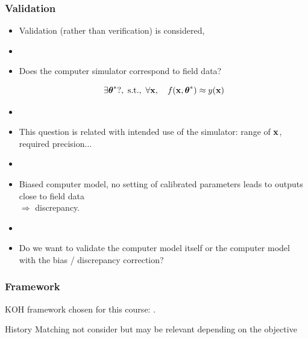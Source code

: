 \documentclass[nopagenumber,9pt]{beamer}
\begin{document}
  \begin{frame}
 \frametitle{Validation}
 \begin{itemize}
  \item Validation (rather than verification) is considered,
  \item[]
  \item Does the computer simulator correspond to field data?
  
  $$\exists \btheta^*?, \ \textrm{s.t.},\ \forall \bx,\quad f(\bx,\btheta^*)\approx y(\bx)$$
  
  \item[]
  
  
  \item This question is related with intended use of the simulator: range of $\mathbf{x}$, required precision... 
  
  \item[]
  
%   
  
  \item Biased computer model, no setting of calibrated parameters leads to outputs close to field data\\
  $\Rightarrow$ {\color{red} discrepancy}.\\
%   
  
  \item[]
  
 \item Do we want to validate the computer model itself or the computer model with the bias / discrepancy correction?
 \end{itemize}

\end{frame}



  \begin{frame}
  \frametitle{Framework}
  KOH framework chosen for this course: \cite{kennedy2001,higdon2004,bayarri2007}.
 

  \bigskip
  
  History Matching not consider but may be relevant depending on the objective \cite{craig1997pressure,vernon2010galaxy, Boukouvalas2014Calibration, Andrianakis2017efficient}
   
  \end{frame}
\end{document}
